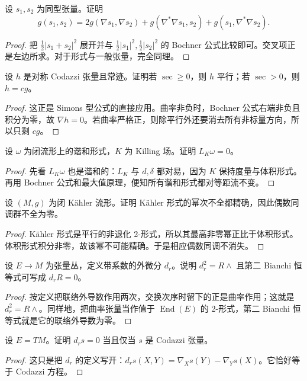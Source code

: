 \documentclass[11pt,a4paper,openany]{ctexbook}
\numberwithin{equation}{chapter}
\begin{document}
\begin{exercise}
设 \(s_1,s_2\) 为同型张量。证明
\[
g(s_1,s_2)=2g(\nabla s_1,\nabla s_2)+g(\nabla^*\nabla s_1,s_2)+g(s_1,\nabla^*\nabla s_2).
\]
\end{exercise}
\begin{proof}
把 \(\frac12|s_1+s_2|^2\) 展开并与 \(\frac12|s_1|^2,\frac12|s_2|^2\) 的 Bochner 公式比较即可。交叉项正是左边所求。对于形式与一般张量，完全同理。
\end{proof}

\begin{exercise}
设 \(h\) 是对称 Codazzi 张量且常迹。证明若 \(\sec\ge 0\)，则 \(h\) 平行；若 \(\sec>0\)，则 \(h=cg\)。
\end{exercise}
\begin{proof}
这正是 Simons 型公式的直接应用。曲率非负时，Bochner 公式右端非负且积分为零，故 \(\nabla h=0\)。若曲率严格正，则除平行外还要消去所有非标量方向，所以只剩 \(cg\)。
\end{proof}

\begin{exercise}
设 \(\omega\) 为闭流形上的谐和形式，\(K\) 为 Killing 场。证明 \(L_K\omega=0\)。
\end{exercise}
\begin{proof}
先看 \(L_K\omega\) 也是谐和的：\(L_K\) 与 \(d,\delta\) 都对易，因为 \(K\) 保持度量与体积形式。再用 Bochner 公式和最大值原理，便知所有谐和形式都对等距流不变。
\end{proof}

\begin{exercise}
设 \((M,g)\) 为闭 Kähler 流形。证明 Kähler 形式的幂次不全都精确，因此偶数同调群不全为零。
\end{exercise}
\begin{proof}
Kähler 形式是平行的非退化 2-形式，所以其最高非零幂正比于体积形式。体积形式积分非零，故该幂不可能精确。于是相应偶数同调不消失。
\end{proof}

\begin{exercise}
设 \(E\to M\) 为张量丛，定义带系数的外微分 \(d_r\)。说明 \(d_r^2=R\wedge\) 且第二 Bianchi 恒等式可写成 \(d_rR=0\)。
\end{exercise}
\begin{proof}
按定义把联络外导数作用两次，交换次序时留下的正是曲率作用；这就是 \(d_r^2=R\wedge\)。同样地，把曲率张量当作值于 \(\operatorname{End}(E)\) 的 2-形式，第二 Bianchi 恒等式就是它的联络外导数为零。
\end{proof}

\begin{exercise}
设 \(E=TM\)。证明 \(d_r s=0\) 当且仅当 \(s\) 是 Codazzi 张量。
\end{exercise}
\begin{proof}
这只是把 \(d_r\) 的定义写开：\(d_r s(X,Y)=\nabla_Xs(Y)-\nabla_Ys(X)\)。它恰好等于 Codazzi 方程。
\end{proof}
\end{document}
